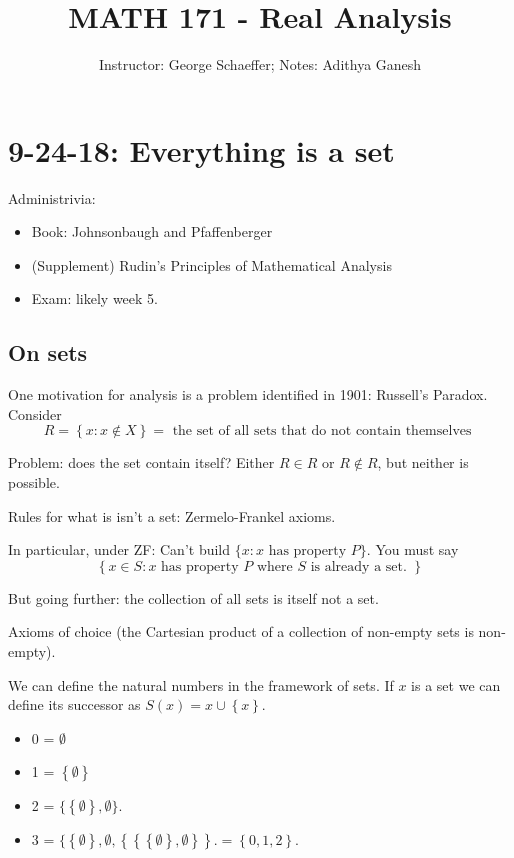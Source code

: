 \documentclass[12pt]{article}
\title{MATH 171 - Real Analysis}
\author{Instructor: George Schaeffer; Notes: Adithya Ganesh}
\begin{document}
\maketitle

\tableofcontents

\section{9-24-18: Everything is a set}

Administrivia:
\begin{itemize}
    \item Book: Johnsonbaugh and Pfaffenberger
    \item (Supplement) Rudin's Principles of Mathematical Analysis
    \item Exam: likely week 5.
\end{itemize}

\subsection{On sets}
One motivation for analysis is a problem identified in 1901: Russell's Paradox.  Consider
\[
  R = \left\{ x : x \not \in X \right\} = \text{ the set of all sets that do not contain themselves }
\]

Problem: does the set contain itself?  Either $R \in R$ or $R \not \in R$, but neither is possible.

Rules for what is isn't a set: Zermelo-Frankel axioms.

In particular, under ZF: Can't build $\{x : x \text{ has property } P \}$.  You must say
\[
  \left\{ x \in S: x \text{ has property } P \text{ where } S \text{ is already a set. } \right\}
\]

But going further: the collection of all sets is itself not a set.

Axioms of choice (the Cartesian product of a collection of non-empty sets is non-empty).

We can define the natural numbers in the framework of sets.  If $x$ is a set we can define its successor as $S(x) = x \cup \left\{ x \right\}$.

\begin{itemize}
  \item 0 = $\emptyset$
  \item 1 = $\left\{ \emptyset \right\}$
  \item 2 = $\{ \left\{ \emptyset \right\}, \emptyset \}$.
  \item 3 = $\{ \left\{ \emptyset \right\}, \emptyset, \left\{ \left\{ \left\{ \emptyset \right\}, \emptyset \right\} \right\}. = \left\{ 0, 1, 2 \right\}$.
\end{itemize}
\end{document}
